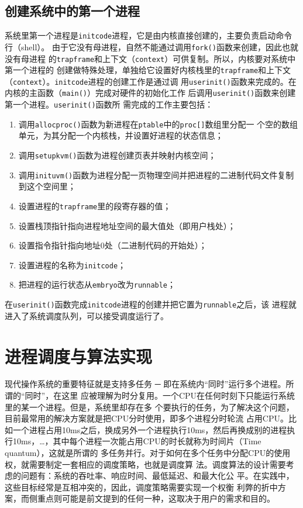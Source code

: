 \documentclass{swfcthesismscctex}
\begin{document}
\subsection{创建系统中的第一个进程}

系统里第一个进程是\texttt{initcode}进程，它是由内核直接创建的，主要负责启动命令行（shell）。
由于它没有母进程，自然不能通过调用\texttt{fork()}函数来创建，因此也就没有母进程
的\texttt{trapframe}和上下文（\texttt{context}）可供复制。所以，内核要对系统中第一个进程的
创建做特殊处理，单独给它设置好内核栈里的\texttt{trapframe}和上下文
（\texttt{context}）\cite{wang2004i386boot}。\texttt{initcode}进程的创建工作是通过调
用\texttt{userinit()}函数来完成的。在内核的主函数（\texttt{main()}）完成对硬件的初始化工作
后调用\texttt{userinit()}函数来创建第一个进程。\texttt{userinit()}函数所
需完成的工作主要包括：
\begin{enumerate}
\item 调用\texttt{allocproc()}函数为新进程在\texttt{ptable}中的\texttt{proc[]}数组里分配一
  个空的数组单元，为其分配一个内核栈，并设置好进程的状态信息；
\item 调用\texttt{setupkvm()}函数为进程创建页表并映射内核空间；
\item 调用\texttt{inituvm()}函数为进程分配一页物理空间并把进程的二进制代码文件复制到这个空间里；
\item 设置进程的\texttt{trapframe}里的段寄存器的值；
\item 设置栈顶指针指向进程地址空间的最大值处（即用户栈处）；
\item 设置指令指针指向地址0处（二进制代码的开始处）；
\item 设置进程的名称为\texttt{initcode}；
\item 把进程的运行状态从\texttt{embryo}改为\texttt{runnable}；
\end{enumerate}

在\texttt{userinit()}函数完成\texttt{initcode}进程的创建并把它置为\texttt{runnable}之后，该
进程就进入了系统调度队列，可以接受调度运行了。

\section{进程调度与算法实现}

现代操作系统的重要特征就是支持多任务 ─ 即在系统内“同时”运行多个进程。所谓的“同时”，在这里
应被理解为时分复用。一个CPU在任何时刻下只能运行系统里的某一个进程。但是，系统里却存在多
个要执行的任务，为了解决这个问题，目前最常用的解决方案就是把CPU分时使用，即多个进程分时轮流
占用CPU。比如一个进程占用10ms之后，换成另外一个进程执行10ms，然后再换成别的进程执
行10ms，\ldots{}，其中每个进程一次能占用CPU的时长就称为时间片（Time quantum），这就是所谓的
多任务并行。对于如何在多个任务中分配CPU的使用权，就需要制定一套相应的调度策略，也就是调度算
法。调度算法的设计需要考虑的问题有：系统的吞吐率、响应时间、最低延迟、和最大化公
平\cite{bach1986design}。在实践中，这些目标经常是互相冲突的，因此，调度策略需要实现一个权衡
利弊的折中方案，而侧重点则可能是前文提到的任何一种，这取决于用户的需求和目的。
\end{document}
